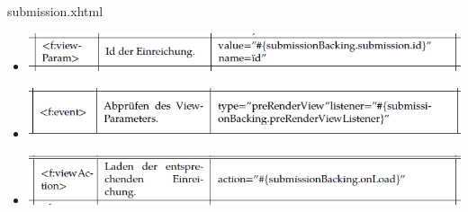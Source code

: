 \documentclass{beamer}
\begin{document}
\begin{frame}{submission.xhtml}
\begin{itemize}
            \item <f:viewParam> %
            \centering
            \includegraphics[height=1.1\textheight]{graphics/facelet/fac_viewParam}

            \item <f:event>
            \centering
            \includegraphics[height=1.1\textheight]{graphics/facelet/fac_event}

            \item <f:viewAction>
            \centering
            \includegraphics[height=1.1\textheight]{graphics/facelet/fac_onLoad}
        \end{itemize}
    \end{frame}
\end{document}
